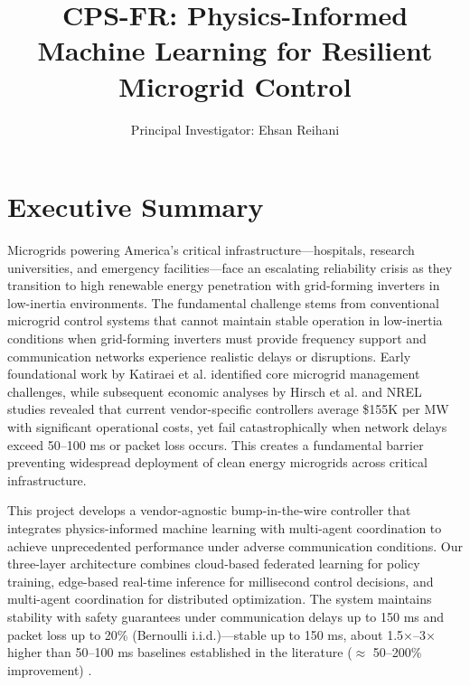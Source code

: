 \documentclass[12pt]{article}
\begin{document}
\vspace{-2cm}
\title{\Large\textbf{CPS-FR: Physics-Informed Machine Learning for Resilient Microgrid Control}}


\author{Principal Investigator: Ehsan Reihani}
\date{}
\vspace{-0.5cm}
\maketitle
\vspace{-0.5cm}
\section{Executive Summary}

Microgrids powering America's critical infrastructure---hospitals, research universities, and emergency facilities---face an escalating reliability crisis as they transition to high renewable energy penetration with grid-forming inverters in low-inertia environments. The fundamental challenge stems from conventional microgrid control systems that cannot maintain stable operation in low-inertia conditions when grid-forming inverters must provide frequency support and communication networks experience realistic delays or disruptions. Early foundational work by Katiraei et al. \cite{katiraei2008} identified core microgrid management challenges, while subsequent economic analyses by Hirsch et al. \cite{hirsch2018} and NREL studies \cite{giraldez2018} revealed that current vendor-specific controllers average \$155K per MW with significant operational costs, yet fail catastrophically when network delays exceed 50--100 ms or packet loss occurs. This creates a fundamental barrier preventing widespread deployment of clean energy microgrids across critical infrastructure.

This project develops a vendor-agnostic bump-in-the-wire controller that integrates physics-informed machine learning with multi-agent coordination to achieve unprecedented performance under adverse communication conditions. Our three-layer architecture combines cloud-based federated learning for policy training, edge-based real-time inference for millisecond control decisions, and multi-agent coordination for distributed optimization. The system maintains stability with safety guarantees under communication delays up to 150 ms and packet loss up to 20\% (Bernoulli i.i.d.)---stable up to 150 ms, about 1.5×--3× higher than 50--100 ms baselines established in the literature ($\approx$ 50--200\% improvement) \cite{bidram2014,simpson2013}.
\end{document}
